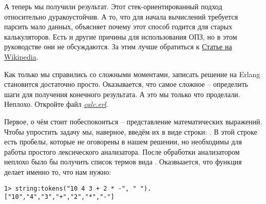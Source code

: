 А теперь мы получили результат.
Этот стек\--ориентированный подход относительно дуракоустойчив.
А то, что для начала вычислений требуется парсить мало данных, объясняет почему этот способ годится для старых калькуляторов.
Есть и другие причины для использования ОПЗ, но в этом руководстве они не обсуждаются.
За этим лучше обратиться к \href{http://en.wikipedia.org/wiki/Reverse_Polish_notation}{Статье на Wikipedia}.

Как только мы справились со сложными моментами, записать решение на Erlang становится достаточно просто.
Оказывается, что самое сложное \--- определить шаги для получения конечного результата.
А это мы только что проделали.
Неплохо.
Откройте файл \emph{\href{http://learnyousomeerlang.com/static/erlang/calc.erl}{calc.erl}}.

Первое, о чём стоит побеспокоиться \--- представление математических выражений.
Чтобы упростить задачу мы, наверное, введём их в виде строки: .
В этой строке есть пробелы, которые не оговорены в нашем решении, но необходимы для работы простого лексического анализатора.
После обработки анализатором неплохо было бы получить список термов вида \ops{[''10'',''4'',''3'',''+'',''2'',''*'',''-'']}.
Оказвыается, что функция  делает именно то, что нам нужно:
\begin{lstlisting}[style=erlang]
1> string:tokens("10 4 3 + 2 * -", " ").
["10","4","3","+","2","*","-"]
\end{lstlisting}
